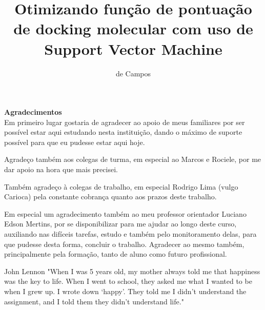 \documentclass[tcc, capa]{texucpel}
\title{Otimizando função de pontuação de docking molecular com uso de Support Vector Machine }
\author{de Campos}{Gianluca}
\begin{document}
\maketitle 
\renewcommand{\advisorname}
{Orientador}          
\sloppy
\fichacatalografica
\folhadeaprovacao

\begin{agradecimentos}
\textbf{Agradecimentos} \\
Em primeiro lugar gostaria de agradecer ao apoio de meus familiares por ser possível estar aqui estudando nesta instituição, dando o máximo de suporte possível para que eu pudesse estar aqui hoje.

Agradeço também aos colegas de turma, em especial ao Marcos e Rociele, por me dar apoio na hora que mais precisei.

Também agradeço à colegas de trabalho, em especial Rodrigo Lima (vulgo Carioca) pela constante cobrança quanto aos prazos deste trabalho.

Em especial um agradecimento também ao meu professor orientador Luciano Edson Mertins, por se disponibilizar para me ajudar ao longo deste curso, auxiliando nas difíceis tarefas, estudo e também pelo monitoramento delas, para que pudesse desta forma, concluir o trabalho. Agradecer ao mesmo também, principalmente pela formação, tanto de aluno como futuro profissional.
\vspace{\baselineskip}
\end{agradecimentos}


\begin{epigrafe}{John Lennon}
"When I was 5 years old, my mother always told me that happiness was the key to life. When I went to school, they asked me what I wanted to be when I grew up. I wrote down ‘happy’. They told me I didn’t understand the assignment, and I told them they didn’t understand life."\\
\end{epigrafe}
\end{document}
